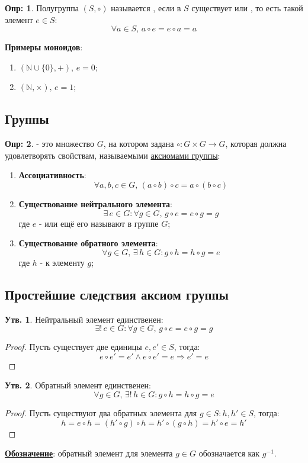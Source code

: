 \documentclass[12pt]{article}
\newcommand{\MN}{\mathbb{N}}
\theoremstyle{definition}
\newtheorem{defn}{Опр:}
\newtheorem{prop}{Утв.}
\begin{document}
\begin{defn}
	Полугруппа $(S,\circ)$ называется , если в $S$ существует  или , то есть такой элемент $e \in S$:
	$$
		\forall a \in S,\, a \circ e = e\circ a = a
	$$
\end{defn}


\textbf{Примеры моноидов}:
\begin{enumerate}[label=\arabic*)]
	\item $(\MN \cup \{0\}, +), \, e = 0$;
	\item $(\MN, \times), \, e = 1$;
\end{enumerate}

\subsection*{Группы}
\begin{defn}
	 - это множество $G$, на котором задана  $\circ \colon G \times G \to G$, которая должна удовлетворять свойствам, называемыми \uline{аксиомами группы}:
	\begin{enumerate}[label=\arabic*)]
		\item \textbf{Ассоциативность}: 
		$$
			\forall a,b,c \in G,\, (a \circ b)\circ c = a\circ (b \circ c)
		$$
		\item \textbf{Существование нейтрального элемента}: 
		$$	
			\exists \, e \in G \colon \forall g \in G, \, g \circ e = e \circ g = g
		$$
		где $e$ -  или ещё его называют  в группе $G$;
		\item \textbf{Существование обратного элемента}:
		$$
			\forall g \in G, \, \exists \, h \in G \colon g \circ h = h \circ g = e	
		$$
		где $h$ -  к элементу $g$;
	\end{enumerate}
\end{defn}

\subsection*{Простейшие следствия аксиом группы}
\begin{prop}
	Нейтральный элемент единственен:
	$$
		\exists! \, e \in G \colon \forall g \in G, \, g \circ e = e \circ g = g
	$$
\end{prop}
\begin{proof}
	Пусть существует две единицы $e, e' \in S$, тогда:
	$$
		e\circ e' = e' \wedge e \circ e' = e \Rightarrow e' = e
	$$	
\end{proof}
\begin{prop}
	Обратный элемент единственен:
	$$
		\forall g \in G, \, \exists! \, h \in G \colon g \circ h = h \circ g = e
	$$
\end{prop}
\begin{proof}
	Пусть существуют два обратных элемента для $g \in S \colon h, h' \in S$, тогда:
	$$
		h = e\circ h = (h' \circ g) \circ h  = h' \circ (g \circ h)	= h' \circ e = h'
	$$
\end{proof}
\textbf{\uline{Обозначение}}: обратный элемент для элемента $g \in G$ обозначается как $g^{-1}$.
\end{document}
